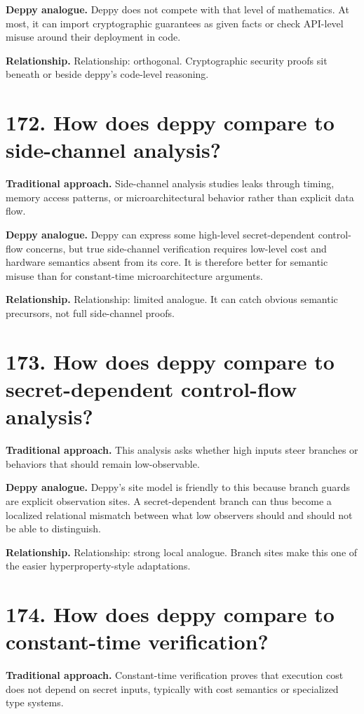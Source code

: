 \documentclass[11pt,openany]{book}
\begin{document}
\textbf{Deppy analogue.} Deppy does not compete with that level of mathematics. At most, it can import cryptographic guarantees as given facts or check API-level misuse around their deployment in code.

\textbf{Relationship.} Relationship: orthogonal. Cryptographic security proofs sit beneath or beside deppy's code-level reasoning.

\section*{172. How does deppy compare to side-channel analysis?}
\textbf{Traditional approach.} Side-channel analysis studies leaks through timing, memory access patterns, or microarchitectural behavior rather than explicit data flow.

\textbf{Deppy analogue.} Deppy can express some high-level secret-dependent control-flow concerns, but true side-channel verification requires low-level cost and hardware semantics absent from its core. It is therefore better for semantic misuse than for constant-time microarchitecture arguments.

\textbf{Relationship.} Relationship: limited analogue. It can catch obvious semantic precursors, not full side-channel proofs.

\section*{173. How does deppy compare to secret-dependent control-flow analysis?}
\textbf{Traditional approach.} This analysis asks whether high inputs steer branches or behaviors that should remain low-observable.

\textbf{Deppy analogue.} Deppy's site model is friendly to this because branch guards are explicit observation sites. A secret-dependent branch can thus become a localized relational mismatch between what low observers should and should not be able to distinguish.

\textbf{Relationship.} Relationship: strong local analogue. Branch sites make this one of the easier hyperproperty-style adaptations.

\section*{174. How does deppy compare to constant-time verification?}
\textbf{Traditional approach.} Constant-time verification proves that execution cost does not depend on secret inputs, typically with cost semantics or specialized type systems.
\end{document}

